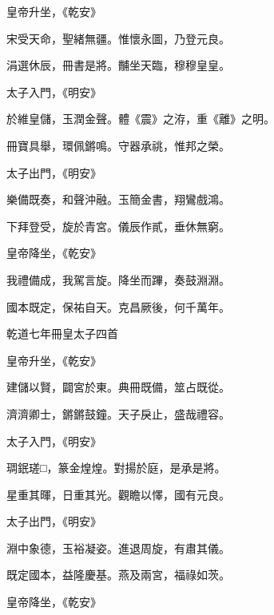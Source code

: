 \begin{pinyinscope}
 皇帝升坐，《乾安》



 宋受天命，聖緒無疆。惟懷永圖，乃登元良。



 涓選休辰，冊書是將。黼坐天臨，穆穆皇皇。



 太子入門，《明安》



 於維皇儲，玉潤金聲。體《震》之洊，重《離》之明。



 冊寶具舉，環佩鏘鳴。守器承祧，惟邦之榮。



 太子出門，《明安》



 樂備既奏，和聲沖融。玉簡金書，翔鸞戲鴻。



 下拜登受，旋於青宮。儀辰作貳，垂休無窮。



 皇帝降坐，《乾安》



 我禮備成，我駕言旋。降坐而蹕，奏鼓淵淵。



 國本既定，保祐自天。克昌厥後，何千萬年。



 乾道七年冊皇太子四首



 皇帝升坐，《乾安》



 建儲以賢，闢宮於東。典冊既備，筮占既從。



 濟濟卿士，鏘鏘鼓鐘。天子戾止，盛哉禮容。



 太子入門，《明安》



 琱鈱瑳□，篆金煌煌。對揚於庭，是承是將。



 星重其暉，日重其光。觀瞻以懌，國有元良。



 太子出門，《明安》



 淵中象德，玉裕凝姿。進退周旋，有肅其儀。



 既定國本，益隆慶基。燕及兩宮，福祿如茨。



 皇帝降坐，《乾安》




\end{pinyinscope}
